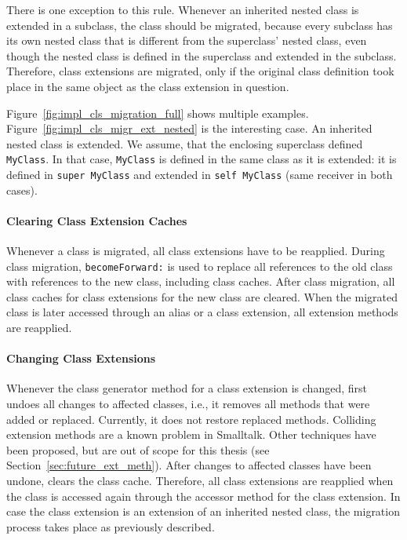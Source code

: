 There is one exception to this rule. Whenever an inherited nested class is extended in a subclass, the class should be migrated, because every subclass has its own nested class that is different from the superclass' nested class, even though the nested class is defined in the superclass and extended in the subclass. Therefore, class extensions are migrated, only if the original class definition took place in the same object as the class extension in question.

Figure~\ref{fig:impl_cls_migration_full} shows multiple examples. Figure~\ref{fig:impl_cls_migr_ext_nested} is the interesting case. An inherited nested class is extended. We assume, that the enclosing superclass defined \texttt{MyClass}. In that case, \texttt{MyClass} is defined in the same class as it is extended: it is defined in \texttt{super MyClass} and extended in \texttt{self MyClass} (same receiver in both cases).

\paragraph{Clearing Class Extension Caches}
Whenever a class is migrated, all class extensions have to be reapplied. During class migration, \texttt{becomeForward:} is used to replace all references to the old class with references to the new class, including class caches. After class migration, all class caches for class extensions for the new class are cleared. When the migrated class is later accessed through an alias or a class extension, all extension methods are reapplied.

\paragraph{Changing Class Extensions}
Whenever the class generator method for a class extension is changed, \msname first undoes all changes to affected classes, i.e., it removes all methods that were added or replaced. Currently, it does not restore replaced methods. Colliding extension methods are a known problem in Smalltalk. Other techniques have been proposed, but are out of scope for this thesis (see Section~\ref{sec:future_ext_meth}). After changes to affected classes have been undone, \msname clears the class cache. Therefore, all class extensions are reapplied when the class is accessed again through the accessor method for the class extension. In case the class extension is an extension of an inherited nested class, the migration process takes place as previously described.

